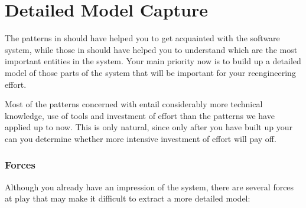 \documentclass[a4paper,10pt,twoside]{book}
\begin{document}
	\renewcommand{\nnbb}[2]{} %
	\sloppy
\fi
\chapter{Detailed Model Capture}

The patterns in  should have helped you to get acquainted with the software system, while those in  should have helped you to understand which are the most important entities in the system. Your main priority now is to build up a detailed model of those parts of the system that will be important for your reengineering effort.

Most of the patterns concerned with  entail considerably more technical knowledge, use of tools and investment of effort than the patterns we have applied up to now. This is only natural, since only after you have built up your  can you determine whether more intensive investment of effort will pay off.

\subsection*{Forces}

Although you already have an impression of the system, there are several forces at play that may make it difficult to extract a more detailed model:
\end{document}
